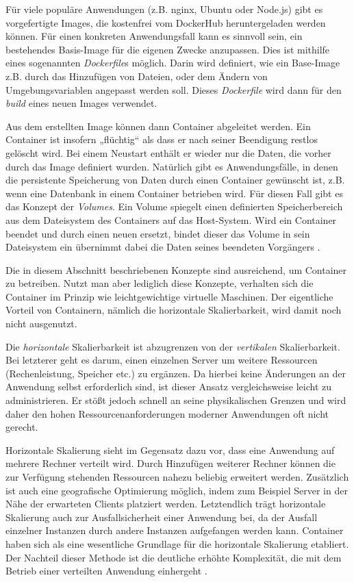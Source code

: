 \documentclass[11pt,a4paper]{article}
\begin{document}
Für viele populäre Anwendungen (z.B. nginx, Ubuntu oder Node.js) gibt es vorgefertigte Images, die kostenfrei vom DockerHub %
heruntergeladen werden können.
Für einen konkreten Anwendungsfall kann es sinnvoll sein, ein bestehendes Basis-Image für die eigenen Zwecke anzupassen.
Dies ist mithilfe eines sogenannten \emph{Dockerfile}s möglich. Darin wird definiert, wie ein Base-Image z.B. durch das Hinzufügen von Dateien,
oder dem Ändern von Umgebungsvariablen angepasst werden soll. Dieses \emph{Dockerfile} wird dann für den \emph{build}
eines neuen Images verwendet. \cite{kofler2021docker}

Aus dem erstellten Image können dann Container abgeleitet werden. Ein Container ist insofern „flüchtig“ als dass er nach seiner
Beendigung restlos gelöscht wird. Bei einem Neustart enthält er wieder nur die Daten, die vorher durch das Image definiert wurden.
Natürlich gibt es Anwendungsfälle, in denen die persistente Speicherung von Daten durch einen Container gewünscht ist, z.B. wenn
eine Datenbank in einem Container betrieben wird. Für diesen Fall gibt es das Konzept der \emph{Volumes}.
Ein Volume spiegelt einen definierten Speicherbereich aus dem Dateisystem des Containers auf das Host-System.
Wird ein Container beendet und durch einen neuen ersetzt, bindet dieser das Volume in sein Dateisystem ein übernimmt
dabei die Daten seines beendeten Vorgängers \cite{kofler2021docker}.

Die in diesem Abschnitt beschriebenen Konzepte sind ausreichend, um Container zu betreiben.
Nutzt man aber lediglich diese Konzepte, verhalten sich die Container im Prinzip wie leichtgewichtige virtuelle Maschinen.
Der eigentliche Vorteil von Containern, nämlich die horizontale Skalierbarkeit, wird damit noch nicht ausgenutzt.

Die \emph{horizontale} Skalierbarkeit ist abzugrenzen von der \emph{vertikalen} Skalierbarkeit.
Bei letzterer geht es darum, einen einzelnen Server um weitere Ressourcen (Rechenleistung, Speicher etc.) zu ergänzen.
Da hierbei keine Änderungen an der Anwendung selbst erforderlich sind, ist dieser Ansatz vergleichsweise leicht
zu administrieren. Er stößt jedoch schnell an seine physikalischen Grenzen und wird daher den hohen
Ressourcenanforderungen moderner Anwendungen oft nicht gerecht.

Horizontale Skalierung sieht im Gegensatz dazu vor, dass eine Anwendung
auf mehrere Rechner verteilt wird. Durch Hinzufügen weiterer Rechner können die zur Verfügung stehenden Ressourcen nahezu beliebig erweitert werden.
Zusätzlich ist auch eine geografische Optimierung möglich, indem zum Beispiel Server in der Nähe der erwarteten Clients platziert werden.
Letztendlich trägt horizontale Skalierung auch zur Ausfallsicherheit einer Anwendung bei, da der Ausfall einzelner Instanzen durch andere Instanzen
aufgefangen werden kann.
Container haben sich als eine wesentliche Grundlage für die horizontale Skalierung etabliert.
Der Nachteil dieser Methode ist die deutliche erhöhte Komplexität,
die mit dem Betrieb einer verteilten Anwendung einhergeht \cite{Schmeling_Dargatz_2022}.
\end{document}
